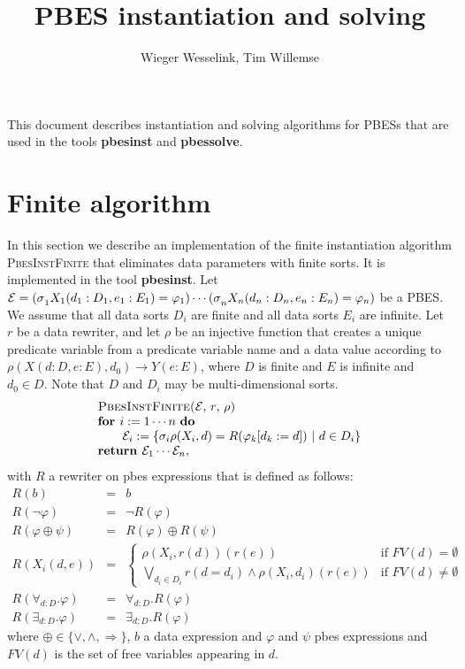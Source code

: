 \documentclass{article}
\begin{document}
\title{PBES instantiation and solving}
\author{Wieger Wesselink, Tim Willemse}
\maketitle

This document describes instantiation and solving algorithms for PBESs that
are used in the tools \textbf{pbesinst} and \textbf{pbessolve}.

\section{Finite algorithm}

In this section we describe an implementation of the finite instantiation
algorithm \textsc{PbesInstFinite} that eliminates data parameters with
finite sorts. It is implemented in the tool \textbf{pbesinst}. Let $\mathcal{%
E=(\sigma }_{1}X_{1}(d_{1}:D_{1},e_{1}:E_{1})=\varphi _{1})\cdots \mathcal{%
(\sigma }_{n}X_{n}(d_{n}:D_{n},e_{n}:E_{n})=\varphi _{n})$ be a PBES. We
assume that all data sorts $D_{i}$ are finite and all data sorts $E_{i}$ are
infinite. Let $r$ be a data rewriter, and let $\rho $ be an injective
function that creates a unique predicate variable from a predicate variable
name and a data value according to $\rho (X(d:D,e:E),d_{0})\rightarrow Y(e:E)
$, where $D$ is finite and $E$ is infinite and $d_{0}\in D$. Note that $D$
and $D_{i}$ may be multi-dimensional sorts.%
\begin{equation*}
\begin{array}{l}
\text{\textsc{PbesInstFinite(}}\mathcal{E}\text{, }r\text{, }\rho \text{%
\textsc{)}} \\
\text{\textbf{for }}i:=1\cdots n\text{ \textbf{do}} \\
\qquad \mathcal{E}_{i}:=\{\mathcal{\sigma }_{i}\rho (X_{i},d)=R(\varphi
_{k}[d_{k}:=d])\ |\ d\in D_{i}\} \\
\text{\textbf{return }}\mathcal{E}_{1}\cdots \mathcal{E}_{n},%
\end{array}%
\end{equation*}%
with $R$ a rewriter on pbes expressions that is defined as follows:%
\begin{eqnarray*}
R(b) &=&b \\
R(\lnot \varphi ) &=&\lnot R(\varphi ) \\
R(\varphi \oplus \psi ) &=&R(\varphi )\oplus R(\psi ) \\
R(X_{i}(d,e)) &=&\left\{
\begin{array}{cc}
\rho (X_{i},r(d))(r(e)) & \text{if }FV(d)=\emptyset  \\
\bigvee\limits_{d_{i}\in D_{i}}r(d=d_{i})\wedge \rho (X_{i},d_{i})(r(e)) &
\text{if }FV(d)\neq \emptyset
\end{array}%
\right.  \\
R(\forall _{d:D}.\varphi ) &=&\forall _{d:D}.R(\varphi ) \\
R(\exists _{d:D}.\varphi ) &=&\exists _{d:D}.R(\varphi )
\end{eqnarray*}%
where $\oplus \in \{\vee ,\wedge ,\Rightarrow \}$, $b$ a data expression and
$\varphi $ and $\psi $ pbes expressions and $FV(d)$ is the set of free
variables appearing in $d$.\newpage
\end{document}
